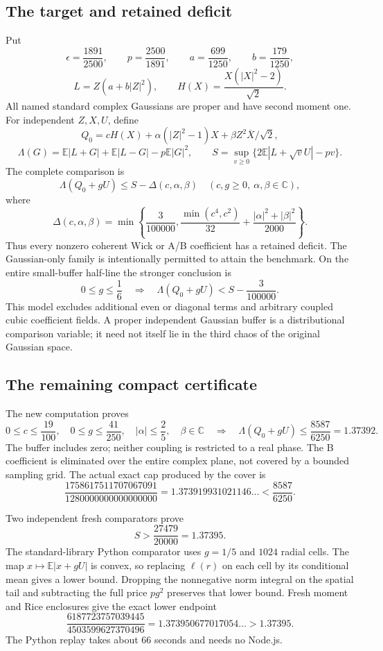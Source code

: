 \subsection{The target and retained deficit}
Put
\[
 \epsilon=\frac{1891}{2500},\qquad p=\frac{2500}{1891},\qquad
 a=\frac{699}{1250},\qquad b=\frac{179}{1250},
\]
\[
 L=Z(a+b|Z|^2),\qquad H(X)=\frac{X(|X|^2-2)}{\sqrt2}.
\]
All named standard complex Gaussians are proper and have second moment
one. For independent $Z,X,U$, define
\[
 Q_0=cH(X)+\alpha(|Z|^2-1)X+
                         \beta Z^2\overline X/\sqrt2,
\]
\[
 \Lambda(G)=\mathbb E|L+G|+\mathbb E|L-G|-p\mathbb E|G|^2,
 \qquad
 S=\sup_{v\ge0}\{2\mathbb E|L+\sqrt vU|-pv\}.
\]
The complete comparison is
\[
 \boxed{\Lambda(Q_0+gU)\le S-\Delta(c,\alpha,\beta)
       \quad(c,g\ge0,\ \alpha,\beta\in\mathbb C),}
 \tag{OD}
\]
where
\[
 \boxed{\Delta(c,\alpha,\beta)=
 \min\left\{\frac3{100000},
 \frac{\min(c^4,c^2)}{32}
       +\frac{|\alpha|^2+|\beta|^2}{2000}\right\}.}
\]
Thus every nonzero coherent Wick or A/B coefficient has a retained
deficit. The Gaussian-only family is intentionally permitted to attain
the benchmark. On the entire small-buffer half-line the
stronger conclusion is
\[
 0\le g\le\frac16
 \quad\Longrightarrow\quad
 \Lambda(Q_0+gU)<S-\frac3{100000}.
 \tag{SB}
\]
This model excludes additional even or diagonal terms and arbitrary
coupled cubic coefficient fields. A proper independent Gaussian buffer
is a distributional comparison variable; it need not itself lie in the
third chaos of the original Gaussian space.

\subsection{The remaining compact certificate}
The new computation proves
\[
 \boxed{0\le c\le\frac{19}{100},\quad
 0\le g\le\frac{41}{250},\quad |\alpha|\le\frac25,\quad
 \beta\in\mathbb C
 \quad\Longrightarrow\quad
 \Lambda(Q_0+gU)\le\frac{8587}{6250}=1.37392.}
 \tag{CC}
\]
The buffer includes zero; neither coupling is restricted to a real
phase. The B coefficient is eliminated over the entire complex plane,
not covered by a bounded sampling grid.
The actual exact cap produced by the cover is
\[
 \frac{1758617511707067091}{1280000000000000000}
 =1.373919931021146\ldots < \frac{8587}{6250}.
\]

Two independent fresh comparators prove
\[
 \boxed{S>\frac{27479}{20000}=1.37395.}
 \tag{B}
\]
The standard-library Python comparator uses $g=1/5$ and $1024$
radial cells. The map $x\mapsto\mathbb E|x+gU|$ is convex, so
replacing $\ell(r)$ on each cell by its conditional mean gives a
lower bound. Dropping the nonnegative norm integral on the spatial
tail and subtracting the full price $pg^2$ preserves that lower bound.
Fresh moment and Rice enclosures give the exact lower endpoint
\[
 \frac{6187723757039445}{4503599627370496}
 =1.373950677017054\ldots >1.37395.
\]
The Python replay takes about $66$ seconds and needs no Node.js.

